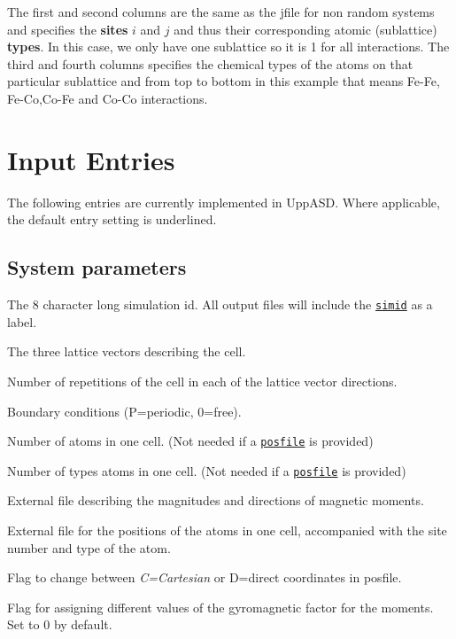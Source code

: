 \documentclass[11pt,fleqn,a4]{book} %
\makeatletter
\newcommand{\litem}[1]{\item[\bfseries#1\index{#1@\texttt{#1}}\label{#1}]}
\newcommand{\rkeyword}[1]{\hyperref[#1]{\texttt{#1}}}
\newcommand{\rfilename}[1]{\hyperref[#1]{\texttt{#1}}}
\makeatother
\begin{document}
The first and second columns are the same as the jfile for non random systems and specifies the \textbf{sites} $i$ and $j$ and thus their corresponding atomic (sublattice) \textbf{types}. In this case, we only have one sublattice so it is 1 for all interactions. The third and fourth columns specifies the chemical types of the atoms on that particular sublattice and from top to bottom in this example that means Fe-Fe, Fe-Co,Co-Fe and Co-Co interactions.  


\section{Input Entries}

The following entries are currently implemented in UppASD. Where applicable, the default entry setting is underlined.

\subsection{System parameters}
\begin{description}[leftmargin=!,labelwidth=\widthof{\bfseries fifteenchars}]
\litem{simid} The 8 character long simulation id. All output files will include the \rkeyword{simid} as a label.
\litem{cell} The three lattice vectors describing the cell. 
\litem{ncell} Number of repetitions of the cell in each of the lattice vector directions. 
\litem{bc} Boundary conditions (P=periodic, 0=free). 
\litem{natoms} Number of atoms in one cell. (Not needed if a \rfilename{posfile} is provided)
\litem{ntypes} Number of types atoms in one cell. (Not needed if a \rfilename{posfile} is provided)
\litem{momfile}  External file describing the magnitudes and directions of magnetic moments.
\litem{posfile} External file for the positions of the atoms in one cell, accompanied with the site number and type of the atom.
\litem{posfiletype} Flag to change between \emph{C=Cartesian} or D=direct coordinates in posfile.
\litem{set_landeg} Flag for assigning different values of the gyromagnetic factor for the moments. Set to 0 by default.
\end{description}
\end{document}
